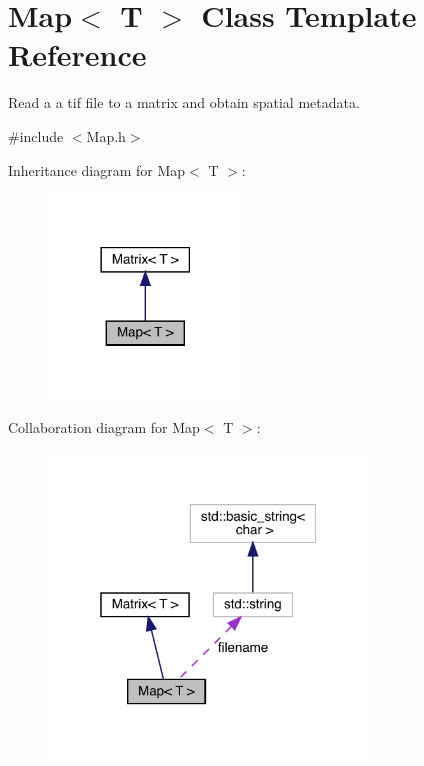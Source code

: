 \hypertarget{class_map}{}\section{Map$<$ T $>$ Class Template Reference}
\label{class_map}


Read a a tif file to a matrix and obtain spatial metadata.  




{\ttfamily \#include $<$Map.\+h$>$}



Inheritance diagram for Map$<$ T $>$\+:
\nopagebreak
\begin{figure}[H]
\begin{center}
\leavevmode
\includegraphics[width=146pt]{class_map__inherit__graph}
\end{center}
\end{figure}


Collaboration diagram for Map$<$ T $>$\+:
\nopagebreak
\begin{figure}[H]
\begin{center}
\leavevmode
\includegraphics[width=241pt]{class_map__coll__graph}
\end{center}
\end{figure}
